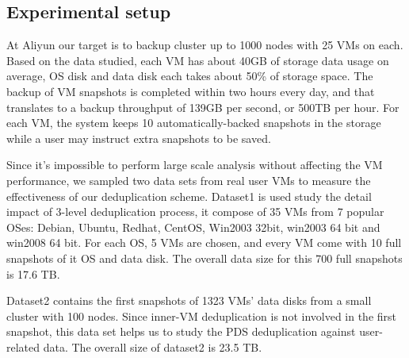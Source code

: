 \subsection{Experimental setup}

At Aliyun our target is to backup cluster up to 1000 nodes
with 25 VMs on each.
Based on the data studied,  each VM has about  40GB of storage  data usage on average,
OS disk and data disk each takes about 50\% of storage space.
The backup of VM snapshots is completed within two hours every day,
and that translates to a backup throughput of 139GB per second, or 500TB per hour.
For each VM, the system keeps 10 automatically-backed snapshots in the storage while
a user may instruct extra snapshots to be saved.



Since it's impossible to perform large scale analysis without affecting the VM performance,
we sampled two data sets from real user VMs to measure the effectiveness of our deduplication scheme.
Dataset1 is used study the detail impact of 3-level deduplication process,
it compose of 35 VMs from 7 popular OSes: 
Debian, Ubuntu, Redhat, CentOS, Win2003 32bit, win2003 64 bit and win2008 64 bit. For each OS, 
5 VMs are chosen, and every VM come with 10 full snapshots of it OS and data disk. 
The overall data size for this 700 full snapshots is 17.6 TB.

Dataset2 contains the first snapshots of 1323 VMs' data disks from a small cluster with 100 nodes. 
Since inner-VM deduplication is not involved in the first snapshot, this data set helps us to 
study the PDS deduplication against user-related data. The overall size of dataset2 is 23.5 TB.

